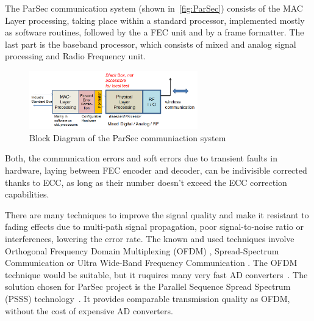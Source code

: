 The ParSec communication system (shown in~\autoref{fig:ParSec}) consists of the MAC Layer processing, taking place within a standard processor, implemented mostly as software routines, followed by the a FEC unit and by a frame formatter. The last part is the baseband processor, which consists of mixed and analog signal processing and Radio Frequency unit. 

\begin{figure}[h]
\centering
\includegraphics[width=0.65\textwidth]{figures/ParSec.png}
\caption{Block Diagram of the ParSec communiaction system}
\label{fig:ParSec}
\end{figure}

Both, the communication errors and soft errors due to transient faults in hardware, laying between FEC encoder and decoder, can be indivisible corrected thanks to ECC, as long as their number doesn't exceed the ECC correction capabilities. 

There are many techniques to improve the signal quality and make it resistant to fading effects due to multi-path signal propagation, poor signal-to-noise ratio or interferences, lowering the error rate. The known and used techniques involve Orthogonal Frequency Domain Multiplexing (OFDM) \cite{book:OFDM,art:OFDM}, Spread-Spectrum Communication \cite{art:spread-spectrum96,art:spread-spectrum97} or Ultra Wide-Band Frequency Communication \cite{book:ultra-wide08,book:ultra-wide04}. The OFDM technique would be suitable, but it ruquires many very fast AD converters~\cite{art:PSSS04}. The solution chosen for ParSec project is the Parallel Sequence Spread Spectrum (PSSS) technology~\cite{art:PSSS15,art:PSSS04,patent}. It provides comparable transmission quality as OFDM, without the cost of expensive AD converters.

